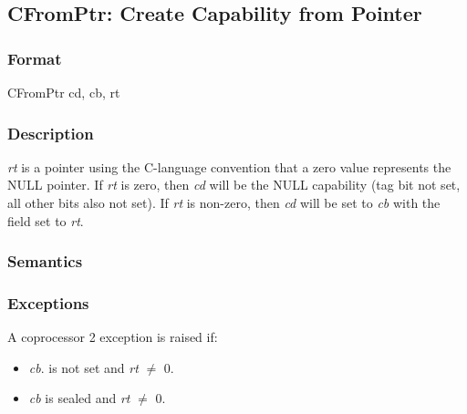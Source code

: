 \clearpage
{}
{}

\subsection*{CFromPtr: Create Capability from Pointer}

\subsubsection*{Format}

CFromPtr cd, cb, rt

\begin{center}
\end{center}


\subsubsection*{Description}

\emph{rt} is a pointer using the C-language convention that a zero value
represents the NULL pointer. If \emph{rt} is zero, then \emph{cd} will be
the NULL capability (tag bit not set, all other bits also not set). If
\emph{rt} is non-zero, then \emph{cd} will be set to \emph{cb} with the
\coffset{} field set to \emph{rt}.

\subsubsection*{Semantics}



\subsubsection*{Exceptions}

A coprocessor 2 exception is raised if:

\begin{itemize}
\item
\emph{cb}.\ctag{} is not set and \emph{rt} $\neq$ 0.
\item
\emph{cb} is sealed and \emph{rt} $\neq$ 0.
\end{itemize}

